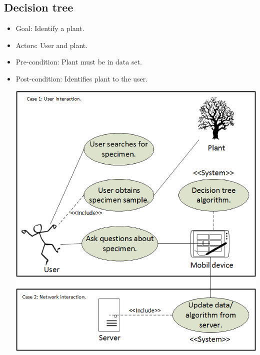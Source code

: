 \documentclass[a4paper]{article}
\begin{document}
\subsection{Decision tree}
\begin{itemize}
\item Goal: Identify a plant.
\item Actors: User and plant.
\item Pre-condition: Plant must be in data set.
\item Post-condition: Identifies plant to the user.
\begin{center}\includegraphics[scale=.8]{DecisionTree.eps}\end{center}
\end{itemize}
\pagebreak
\end{document}
